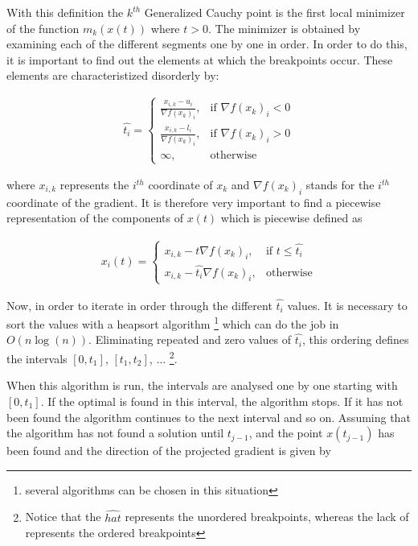 With this definition the $k^{th}$ Generalized Cauchy point is the first local minimizer of the function $m_k(x(t))$ where $t > 0$.  The minimizer is obtained by examining each of the different segments one by one in order.  In order to do this, it is important to find out the elements at which the breakpoints occur.  These elements are characteristized disorderly by:

\begin{equation} 
  \begin{aligned} \label{findingt}
    \hat{t_i} = 
    \begin{cases}
      \frac{x_{i,k} - u_i}{\nabla f(x_k)_i}, & \text{if } \nabla f(x_k)_i < 0 \\
      \frac{x_{i,k} - l_i}{\nabla f(x_k)_i}, & \text{if } \nabla f(x_k)_i > 0 \\
      \infty, & \text{otherwise}
    \end{cases}
  \end{aligned}
\end{equation}

where $x_{i,k}$ represents the $i^{th}$ coordinate of $x_k$ and $\nabla f(x_k)_i$ stands for the $i^{th}$ coordinate of the gradient.  It is therefore very important to find a piecewise representation of the components of $x(t)$ which is piecewise defined as

\begin{equation}
  \begin{aligned}
    x_i(t) = 
    \begin{cases}
      x_{i,k} - t \nabla f(x_k)_i, & \text{if } t \leq \hat{t_i} \\
      x_{i,k} - \hat{t_i} \nabla f(x_k)_i, & \text{otherwise}
    \end{cases}
  \end{aligned}
\end{equation}

Now, in order to iterate in order through the different $\hat{t_i}$ values.  It is necessary to sort the values with a heapsort algorithm \footnote{several algorithms can be chosen in this situation} which can do the job in $O(n \log{(n)})$.  Eliminating repeated and zero values of $\hat{t_i}$, this ordering defines the intervals $[0, t_1]$, $[t_1, t_2]$, $\ldots$ \footnote{Notice that the $\hat{hat}$ represents the unordered breakpoints, whereas the lack of represents the ordered breakpoints}.

When this algorithm is run, the intervals are analysed one by one starting with $[0, t_1]$.  If the optimal is found in this interval, the algorithm stops.  If it has not been found the algorithm continues to the next interval and so on.  Assuming that the algorithm has not found a solution until $t_{j-1}$, and the point $x(t_{j-1})$ has been found and the direction of the projected gradient is given by

